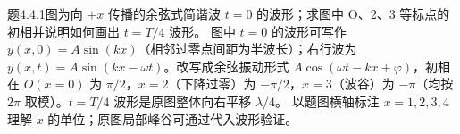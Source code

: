 \problemtext 题4.4.1图为向 $+x$ 传播的余弦式简谐波 $t=0$ 的波形；求图中 O、2、3 等标点的初相并说明如何画出 $t=T/4$ 波形。
\workings 图中 $t=0$ 的波形可写作 $y(x,0)=A\sin(kx)$（相邻过零点间距为半波长）；右行波为 $\boxed{y(x,t)=A\sin(kx-\omega t)}$。改写成余弦振动形式 $A\cos(\omega t-kx+\varphi)$，初相在 $O(x=0)$ 为 $\pi/2$，$x=2$（下降过零）为 $-\pi/2$，$x=3$（波谷）为 $-\pi$（均按 $2\pi$ 取模）。$t=T/4$ 波形是原图整体向右平移 $\boxed{\lambda/4}$。
\crosscheck 以题图横轴标注 $x=1,2,3,4$ 理解 $x$ 的单位；原图局部峰谷可通过代入波形验证。
